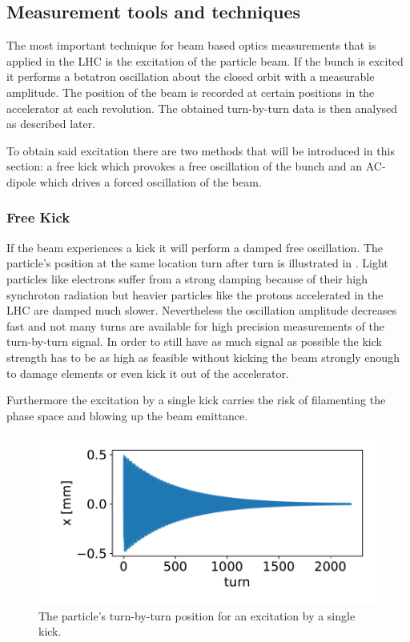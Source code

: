 \subsection{Measurement tools and techniques}

The most important technique for beam based optics measurements that is applied in the LHC is the excitation
of the particle beam.
If the bunch is excited it performs a betatron oscillation about the closed orbit with a measurable amplitude.
The position of the beam is recorded at certain positions in the accelerator at each revolution. The
obtained turn-by-turn data is then analysed as described later.

To obtain said excitation there are two methods that will be introduced in this section: a free kick
which provokes a free oscillation of the bunch and an AC-dipole which drives a forced oscillation of
the beam. 

\subsubsection{Free Kick}

If the beam experiences a kick it will perform a damped free oscillation.
The particle's position at the same location turn after turn is illustrated in .
Light particles like electrons
suffer from a strong damping because of their high synchroton radiation but heavier particles like the
protons accelerated in the LHC are damped much slower.
Nevertheless the oscillation amplitude decreases fast and not many turns are available for high
precision measurements of the turn-by-turn signal. In order to still have as much signal as possible
the kick strength has to be as high as feasible without kicking the beam strongly enough to damage elements or even kick it out of the accelerator.

Furthermore the excitation by a single kick carries the risk of filamenting the
phase space and blowing up the beam emittance.
%
\begin{figure}[ht]
    \centering
    \includegraphics[width=.8\linewidth]{kick_plot.pdf}  
    \caption{The particle's turn-by-turn position for an excitation by a single kick.}
    \label{fig_kick_plot}
\end{figure}
%

